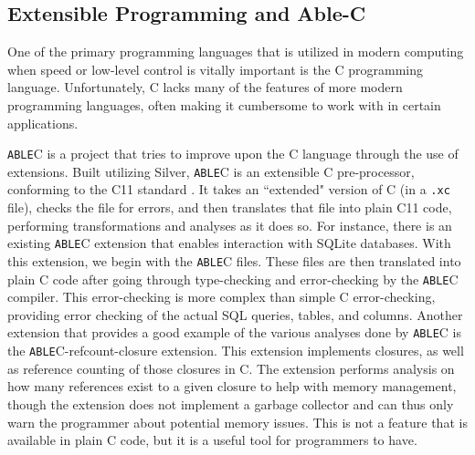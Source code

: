 \documentclass[main.tex]{subfiles}
\begin{document}
\subsection{Extensible Programming and Able-C} %
One of the primary programming languages that is utilized in modern computing
when speed or low-level control is vitally important is the C programming
language. Unfortunately, C lacks many of the features of more modern programming
languages, often making it cumbersome to work with in certain applications.

\verb|ABLE|C \cite{10} is a project that tries to improve upon the C language through the use
of extensions. Built utilizing Silver, \verb|ABLE|C is an 
extensible C pre-processor, conforming to the C11 standard \cite{10}. It takes an
``extended" version of C (in a \verb|.xc| file), checks the file for errors, and then translates that
file into plain C11 code, performing
transformations and analyses as it does so. For instance, there is an existing
\verb|ABLE|C extension that enables interaction with SQLite databases. With this
extension, we begin with the \verb|ABLE|C files. These files are then translated
into plain C code after going through type-checking and error-checking by the
\verb|ABLE|C compiler. This error-checking is more complex than simple C error-checking,
providing error checking of the actual SQL queries, tables, and columns.
Another extension that provides a good example of the various analyses done by
\verb|ABLE|C is the \verb|ABLE|C-refcount-closure extension. This extension
implements closures, as well as reference counting of those closures in C. The extension performs analysis
on how many references exist to a given closure to help with memory management, though the extension
does not implement a garbage collector and can thus only warn the programmer about potential memory issues.
This is not a feature that is available in plain C code, but it is a useful tool for programmers to have.
\end{document}
